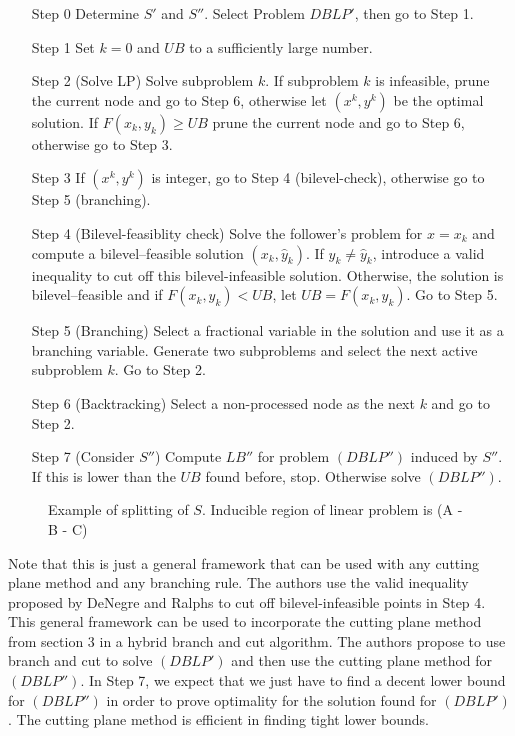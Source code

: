 \documentclass{article}
\begin{document}
	\begin{itemize}
		\item[Step 0]Determine $S'$ and $S''$. Select Problem $DBLP'$, then go to Step 1.
		\item[Step 1]Set $k = 0$ and $UB$ to a sufficiently large number.
		\item[Step 2](Solve LP) Solve subproblem $k$. If subproblem $k$ is infeasible, prune the current node and
		go to Step 6, otherwise let $(x^k,y^k)$ be the optimal solution. If $F(x_k,y_k) \ge UB$ prune the current node and go to Step 6, otherwise go to Step 3.
		\item [Step 3] If $(x^k, y^k)$ is integer, go to Step 4 (bilevel-check), otherwise go to Step 5 (branching).
		\item [Step 4](Bilevel-feasiblity check) Solve the follower’s problem for $x = x_k$ and compute a bilevel–feasible solution $(x_k , \hat y_k )$. If $y_k \neq \hat y_k$, introduce a valid inequality to cut off this bilevel-infeasible solution. Otherwise,
		the solution is bilevel–feasible and if $F(x_k , y_k ) < U B$, let $U B = F(x_k , y_k )$.
		Go to Step 5.
		\item [Step 5](Branching) Select a fractional variable in the solution and use it as a branching variable. Generate two subproblems and select the next active subproblem $k$. Go to Step 2.
		\item [Step 6](Backtracking) Select a non-processed node as the next $k$ and go to Step 2.
		\item [Step 7](Consider $S''$) Compute $LB''$ for problem $(DBLP'')$ induced by $S''$. If this is lower than the $UB$ found before, stop.
		Otherwise solve $(DBLP'')$.
	\end{itemize}
	
		\begin{figure}[H]
						\centering
			
			\caption{Example of splitting of $S$. Inducible region of linear problem is (A - B - C)}
		\end{figure}
Note that this is just a general framework that can be used with any cutting plane method and any branching rule. The authors use the valid inequality proposed by DeNegre and Ralphs \cite{DeNegre2009} to cut off bilevel-infeasible points in Step 4.
This general framework can be used to incorporate the cutting plane method from section 3 in a hybrid branch and cut algorithm. The authors propose to use branch and cut to solve $(DBLP')$ and then use the cutting plane method for $(DBLP'')$. In Step 7, we expect that we just have to find a decent lower bound for $(DBLP'')$ in order to prove optimality for the solution found for $(DBLP')$. The cutting plane method is efficient in finding tight lower bounds. 
\end{document}
